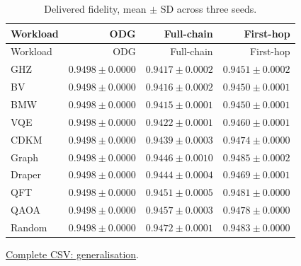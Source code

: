 \begin{center}\small
\begin{longtable}{lrrr}
\caption{Delivered fidelity, mean $\pm$ SD across three seeds.}\\
\toprule
Workload & ODG & Full-chain & First-hop \\
\midrule\endfirsthead
\toprule
Workload & ODG & Full-chain & First-hop \\
\midrule\endhead
GHZ & $0.9498 \pm 0.0000$ & $0.9417 \pm 0.0002$ & $0.9451 \pm 0.0002$ \\
BV & $0.9498 \pm 0.0000$ & $0.9416 \pm 0.0002$ & $0.9450 \pm 0.0001$ \\
BMW & $0.9498 \pm 0.0000$ & $0.9415 \pm 0.0001$ & $0.9450 \pm 0.0001$ \\
VQE & $0.9498 \pm 0.0000$ & $0.9422 \pm 0.0001$ & $0.9460 \pm 0.0001$ \\
CDKM & $0.9498 \pm 0.0000$ & $0.9439 \pm 0.0003$ & $0.9474 \pm 0.0000$ \\
Graph & $0.9498 \pm 0.0000$ & $0.9446 \pm 0.0010$ & $0.9485 \pm 0.0002$ \\
Draper & $0.9498 \pm 0.0000$ & $0.9444 \pm 0.0004$ & $0.9469 \pm 0.0001$ \\
QFT & $0.9498 \pm 0.0000$ & $0.9451 \pm 0.0005$ & $0.9481 \pm 0.0000$ \\
QAOA & $0.9498 \pm 0.0000$ & $0.9457 \pm 0.0003$ & $0.9478 \pm 0.0000$ \\
Random & $0.9498 \pm 0.0000$ & $0.9472 \pm 0.0001$ & $0.9483 \pm 0.0000$ \\
\bottomrule\end{longtable}\end{center}
{\footnotesize \href{https://github.com/sanjeevkrishnaa/Compiler-Driven-ACE/blob/codex/ace-scheduler-correctness/docs/latex/oct25_pre_golden/data/generalisation.csv}{Complete CSV: generalisation}. }

